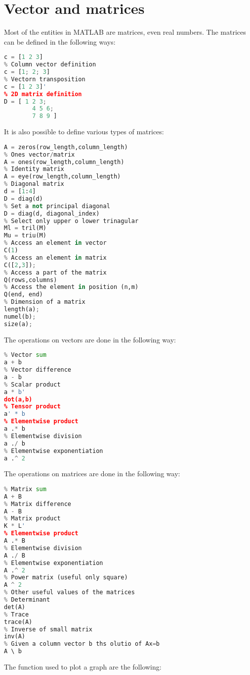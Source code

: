 \documentclass[12pt, a4paper]{report}
\newtheorem[style=M,bodystyle=\normalfont]{theorem}{Theorem}
\newtheorem[style=M,bodystyle=\normalfont]{corollary}{Corollary}
\newtheorem[style=M,bodystyle=\normalfont]{lemma}{Lemma}
\newtheorem[style=M,bodystyle=\normalfont]{definition}{Definition}
\begin{document}
    \section{Vector and matrices}
    Most of the entities in MATLAB are matrices, even real numbers. The matrices can be defined in the following ways: 
    \begin{lstlisting}[language=Python]
% Row vector definition
c = [1 2 3]
% Column vector definition
c = [1; 2; 3]
% Vectorn transposition
c = [1 2 3]'
% 2D matrix definition
D = [ 1 2 3; 
        4 5 6; 
        7 8 9 ]
    \end{lstlisting}
    It is also possible to define various types of matrices: 
    \begin{lstlisting}[language=Python]
% Zeros vector/matrix
A = zeros(row_length,column_length)	
% Ones vector/matrix
A = ones(row_length,column_length)	
% Identity matrix
A = eye(row_length,column_length)   
% Diagonal matrix
d = [1:4]
D = diag(d)
% Set a not principal diagonal 
D = diag(d, diagonal_index)
% Select only upper o lower trinagular
Ml = tril(M)
Mu = triu(M)
% Access an element in vector
C(1)
% Access an element in matrix
C([2,3]);
% Access a part of the matrix
Q(rows,columns)    
% Access the element in position (n,m)
Q(end, end)   
% Dimension of a matrix
length(a);
numel(b);
size(a);
    \end{lstlisting}  
    The operations on vectors are done in the following way: 
    \begin{lstlisting}[language=Python]
% Given two row vectors a and b
% Vector sum
a + b    
% Vector difference
a - b   
% Scalar product
a * b'      
dot(a,b)   
% Tensor product
a' * b      
% Elementwise product
a .* b  
% Elementwise division    
a ./ b  
% Elementwise exponentiation    
a .^ 2      
    \end{lstlisting}  
    The operations on matrices are done in the following way: 
    \begin{lstlisting}[language=Python]
% Givcen two matrices A and B (both 3x2)
% Matrix sum
A + B
% Matrix difference
A - B
% Matrix product
K * L'
% Elementwise product
A .* B
% Elementwise division
A ./ B      
% Elementwise exponentiation
A .^ 2      
% Power matrix (useful only square)
A ^ 2         
% Other useful values of the matrices
% Determinant
det(A)
% Trace
trace(A)  
% Inverse of small matrix      
inv(A)          
% Given a column vector b ths olutio of Ax=b
A \ b       
    \end{lstlisting}  
    The function used to plot a graph are the following: 
\end{document}
